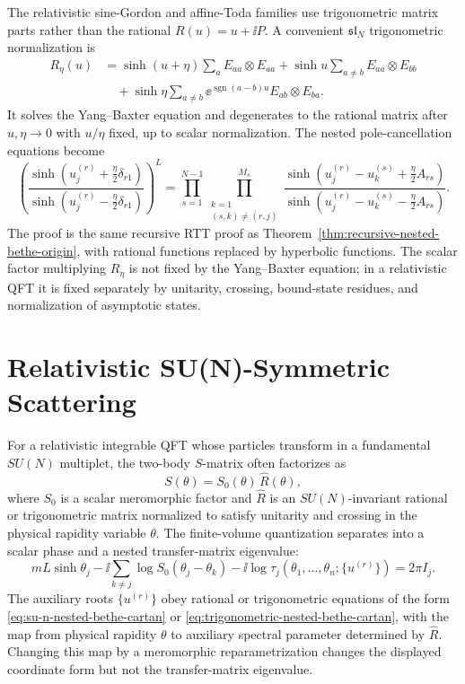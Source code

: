 The relativistic sine-Gordon and affine-Toda families use trigonometric
matrix parts rather than the rational \(R(u)=u+\ii P\).  A convenient
\(\mathfrak{sl}_N\) trigonometric normalization is
\[
\begin{aligned}
  R_\eta(u)
  &=
  \sinh(u+\eta)\sum_a E_{aa}\otimes E_{aa}
  +
  \sinh u\sum_{a\ne b}E_{aa}\otimes E_{bb}
\\
  &\quad
  +
  \sinh\eta
  \sum_{a\ne b}\ee^{\operatorname{sgn}(a-b)u}
  E_{ab}\otimes E_{ba}.
\end{aligned}
\]
It solves the Yang--Baxter equation and degenerates to the rational matrix
after \(u,\eta\to0\) with \(u/\eta\) fixed, up to scalar normalization.  The
nested pole-cancellation equations become
\begin{equation}
  \left(
    \frac{\sinh(u_j^{(r)}+\frac{\eta}{2}\delta_{r1})}
         {\sinh(u_j^{(r)}-\frac{\eta}{2}\delta_{r1})}
  \right)^L
  =
  \prod_{s=1}^{N-1}
  \prod_{\substack{k=1\\(s,k)\ne(r,j)}}^{M_s}
  \frac{\sinh(u_j^{(r)}-u_k^{(s)}+\frac{\eta}{2}A_{rs})}
       {\sinh(u_j^{(r)}-u_k^{(s)}-\frac{\eta}{2}A_{rs})}.
  \label{eq:trigonometric-nested-bethe-cartan}
\end{equation}
The proof is the same recursive RTT proof as
Theorem~\ref{thm:recursive-nested-bethe-origin}, with rational functions
replaced by hyperbolic functions.  The scalar factor multiplying
\(R_\eta\) is not fixed by the Yang--Baxter equation; in a relativistic QFT it
is fixed separately by unitarity, crossing, bound-state residues, and
normalization of asymptotic states.

\section{Relativistic SU(N)-Symmetric Scattering}

For a relativistic integrable QFT whose particles transform in a fundamental
\(SU(N)\) multiplet, the two-body \(S\)-matrix often factorizes as
\[
  S(\theta)=S_0(\theta)\,\widehat R(\theta),
\]
where \(S_0\) is a scalar meromorphic factor and \(\widehat R\) is an
\(SU(N)\)-invariant rational or trigonometric matrix normalized to satisfy
unitarity and crossing in the physical rapidity variable \(\theta\).  The
finite-volume quantization separates into a scalar phase and a nested
transfer-matrix eigenvalue:
\begin{equation}
  mL\sinh\theta_j
  -\ii\sum_{k\neq j}\log S_0(\theta_j-\theta_k)
  -\ii\log \tau_j(\theta_1,\ldots,\theta_n;\{u^{(r)}\})
  =
  2\pi I_j .
  \label{eq:relativistic-nested-bethe-yang}
\end{equation}
The auxiliary roots \(\{u^{(r)}\}\) obey rational or trigonometric equations
of the form \eqref{eq:su-n-nested-bethe-cartan} or
\eqref{eq:trigonometric-nested-bethe-cartan}, with the map from physical
rapidity \(\theta\) to auxiliary spectral parameter determined by
\(\widehat R\).  Changing this map by a meromorphic reparametrization changes
the displayed coordinate form but not the transfer-matrix eigenvalue.

